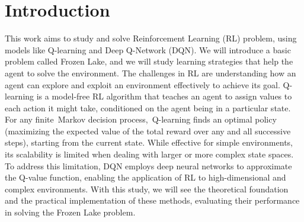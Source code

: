 \chapter{Introduction}
This work aims to study and solve Reinforcement Learning (RL) problem, using models like Q-learning and Deep Q-Network (DQN).
We will introduce a basic problem called Frozen Lake, and we will study learning strategies that help the agent to solve the environment.
The challenges in RL are understanding how an agent can explore and exploit an environment effectively to achieve its goal.  
Q-learning is a model-free RL algorithm that teaches an agent to assign values to each action it might take, conditioned on the agent being in a particular state. For any finite Markov decision process, Q-learning finds an optimal policy (maximizing the expected value of the total reward over any and all successive steps), starting from the current state.
While effective for simple environments, its scalability is limited when dealing with larger or more complex state spaces. To address this limitation, DQN employs deep neural networks to approximate the Q-value function, enabling the application of RL to high-dimensional and complex environments.
With this study, we will see the theoretical foundation and the practical implementation of these methods, evaluating their performance in solving the Frozen Lake problem.
